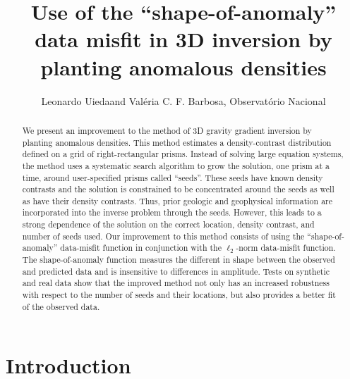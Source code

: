 \documentclass{segabs}
\title{Use of the ``shape-of-anomaly'' data misfit in 3D 
inversion by planting anomalous densities}
\author{Leonardo Uieda\footnotemark[1] and Val\'eria C. F. Barbosa,
Observat\'orio Nacional}
\begin{document}
\maketitle

\begin{abstract}
We present an improvement to the method of 3D gravity gradient inversion by
planting anomalous densities.
This method estimates a density-contrast distribution defined on a grid of
right-rectangular prisms.
Instead of solving large equation systems, the method uses a systematic search
algorithm to grow the solution, one prism at a time, around user-specified
prisms called ``seeds''.
These seeds have known density contrasts and the solution is constrained to be
concentrated around the seeds as well as have their density contrasts.
Thus, prior geologic and geophysical information are incorporated into the
inverse problem through the seeds.
However, this leads to a strong dependence of the solution on the correct
location, density contrast, and number of seeds used.
Our improvement to this method consists of using the ``shape-of-anomaly''
data-misfit function in conjunction with the $\ell_{2}$-norm data-misfit
function.
The shape-of-anomaly function measures the different in shape between the
observed and predicted data and is insensitive to differences in amplitude.
Tests on synthetic and real data show that the improved method not only has an
increased robustness with respect to the number of seeds and their locations,
but also provides a better fit of the observed data.
\end{abstract}

\section{Introduction}
\end{document}
